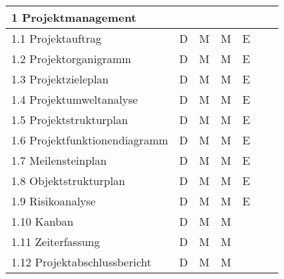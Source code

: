 \begin{longtable}{|l|c|c|c|c|c|c|}
    \multicolumn{7}{|l|}{1 Projektmanagement}                                                                                     \\ \hline
    1.1 Projektauftrag                     & D              & M           & M          & E        &               &               \\ \hline
    1.2 Projektorganigramm                 & D              & M           & M          & E        &               &               \\ \hline
    1.3 Projektzieleplan                   & D              & M           & M          & E        &               &               \\ \hline
    1.4 Projektumweltanalyse               & D              & M           & M          & E        &               &               \\ \hline
    1.5 Projektstrukturplan                & D              & M           & M          & E        &               &               \\ \hline
    1.6 Projektfunktionendiagramm          & D              & M           & M          & E        &               &               \\ \hline
    1.7 Meilensteinplan                    & D              & M           & M          & E        &               &               \\ \hline
    1.8 Objektstrukturplan                 & D              & M           & M          & E        &               &               \\ \hline
    1.9 Risikoanalyse                      & D              & M           & M          & E        &               &               \\ \hline
    1.10 Kanban                            & D              & M           & M          &          &               &               \\ \hline
    1.11 Zeiterfassung                     & D              & M           & M          &          &               &               \\ \hline
    1.12 Projektabschlussbericht           & D              & M           & M          &          &               &               \\ \hline


\end{longtable}
